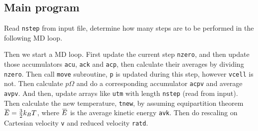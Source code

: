 
\subsection{Main program}

Read \texttt{nstep} from input file, determine how many steps are
to be performed in the following MD loop.

Then we start a MD loop.
First update the current step \texttt{nzero}, and then update those
accumulators \texttt{acu}, \texttt{ack} and \texttt{acp}, then calculate
their averages by dividing \texttt{nzero}. Then call \texttt{move} subroutine,
\texttt{p} is updated during this step, however \texttt{vcell} is not.
Then calculate $p \Omega$ and do a corresponding accumulator \texttt{acpv} and
average \texttt{avpv}. And then, update arrays like \texttt{utm} with length
\texttt{nstep} (read from input).
Then calculate the new temperature, \texttt{tnew}, by assuming equipartition
theorem $\mean{E} = \frac{ 3 }{ 2 } k_B T$, where $\mean{E}$ is
the average kinetic energy \texttt{avk}.
Then do rescaling on Cartesian velocity \texttt{v} and reduced velocity
\texttt{ratd}.

